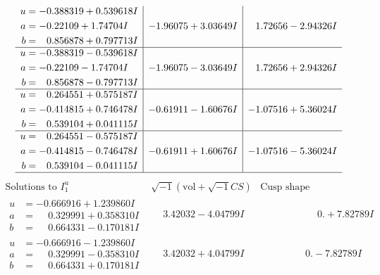 \documentclass[1p]{elsarticle_modified}
\theoremstyle{definition}
\newcommand{\I}{\sqrt{-1}}
\begin{document}
$$\begin{array}{c|c|c}
\begin{aligned}
u &= -0.388319 + 0.539618 I \\
a &= -0.22109 + 1.74704 I \\
b &= \phantom{-}0.856878 + 0.797713 I\end{aligned}
 & -1.96075 + 3.03649 I & \phantom{-}1.72656 - 2.94326 I \\ \hline\begin{aligned}
u &= -0.388319 - 0.539618 I \\
a &= -0.22109 - 1.74704 I \\
b &= \phantom{-}0.856878 - 0.797713 I\end{aligned}
 & -1.96075 - 3.03649 I & \phantom{-}1.72656 + 2.94326 I \\ \hline\begin{aligned}
u &= \phantom{-}0.264551 + 0.575187 I \\
a &= -0.414815 + 0.746478 I \\
b &= \phantom{-}0.539104 + 0.041115 I\end{aligned}
 & -0.61911 - 1.60676 I & -1.07516 + 5.36024 I \\ \hline\begin{aligned}
u &= \phantom{-}0.264551 - 0.575187 I \\
a &= -0.414815 - 0.746478 I \\
b &= \phantom{-}0.539104 - 0.041115 I\end{aligned}
 & -0.61911 + 1.60676 I & -1.07516 - 5.36024 I\\
 \hline 
 \end{array}$$\newpage$$\begin{array}{c|c|c}  
\text{Solutions to }I^u_{1}& \I (\text{vol} + \sqrt{-1}CS) & \text{Cusp shape}\\
 \hline 
\begin{aligned}
u &= -0.666916 + 1.239860 I \\
a &= \phantom{-}0.329991 + 0.358310 I \\
b &= \phantom{-}0.664331 - 0.170181 I\end{aligned}
 & \phantom{-}3.42032 - 4.04799 I & \phantom{-0.000000 -}0. + 7.82789 I \\ \hline\begin{aligned}
u &= -0.666916 - 1.239860 I \\
a &= \phantom{-}0.329991 - 0.358310 I \\
b &= \phantom{-}0.664331 + 0.170181 I\end{aligned}
 & \phantom{-}3.42032 + 4.04799 I & \phantom{-0.000000 } 0. - 7.82789 I \\ \hline\begin{aligned}

\end{aligned}
\end{array}$$
\end{document}
